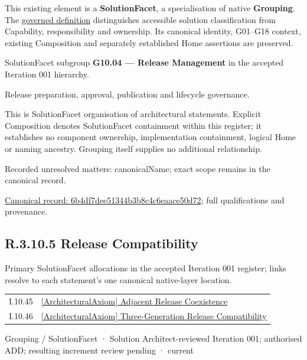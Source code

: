 This existing element is a \textbf{SolutionFacet}, a specialisation of native
\textbf{Grouping}. The \href{\detokenize{../../../../../../../governance/continuum-representation.md#solutionfacet-classification--1119-candidate}}{governed definition}
distinguishes accessible solution classification from Capability, responsibility
and ownership. Its canonical identity, G01–G18 context, existing Composition
and separately established Home assertions are preserved.



SolutionFacet subgroup \textbf{G10.04 — Release Management} in the accepted Iteration 001 hierarchy.



Release preparation, approval, publication and lifecycle governance.



This is SolutionFacet organisation of architectural statements. Explicit Composition denotes SolutionFacet containment within this register; it establishes no component ownership, implementation containment, logical Home or naming ancestry. Grouping itself supplies no additional relationship.


{\small Recorded unresolved matters: canonicalName; exact scope remains in the canonical record.}\par
{\footnotesize \href{../../../../../../../continuum/grouping/6b4df7dee51344b3b8c4c6eaace50d72.md}{Canonical record: 6b4df7dee51344b3b8c4c6eaace50d72}; full qualifications and provenance.}\par
\subsection*{R.3.10.5 Release Compatibility}
\label{navigation:R.3.10.5}

Primary SolutionFacet allocations in the accepted Iteration 001 register; links resolve to each statement’s one canonical native-layer location.\par
\begin{longtable}{p{.22\linewidth}p{.73\linewidth}}
I.10.45 & \hyperref[element:3ce5568f2ded498386fd6fcfb142f89a]{[ArchitecturalAxiom] Adjacent Release Coexistence} \\
I.10.46 & \hyperref[element:33d348c2936b401aa567d8fa531147ea]{[ArchitecturalAxiom] Three-Generation Release Compatibility} \\
\end{longtable}
\label{element:7f9cadb36d764b22840748a9608f9a37}
{\small Grouping / SolutionFacet · Solution Architect-reviewed Iteration 001; authorised ADD; resulting increment review pending · current}\par

